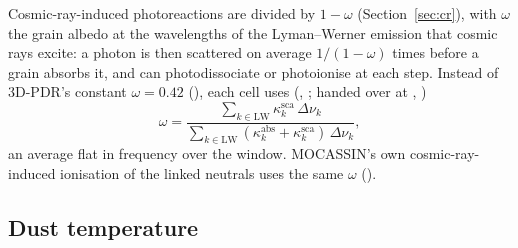 Cosmic-ray-induced photoreactions are divided by $1-\omega$
(Section~\ref{sec:cr}), with $\omega$ the grain albedo at the wavelengths of
the \Htwo{} Lyman--Werner emission that cosmic rays excite: a photon is then
scattered on average $1/(1-\omega)$ times before a grain absorbs it, and
can photodissociate or photoionise at each step. Instead of 3D-PDR's
constant $\omega=0.42$ (), each cell uses
(, ; handed over at
, )
\begin{equation}
  \omega = \frac{\sum_{k\in\mathrm{LW}} \kappa^{\mathrm{sca}}_k\,\Delta\nu_k}
                {\sum_{k\in\mathrm{LW}} (\kappa^{\mathrm{abs}}_k+\kappa^{\mathrm{sca}}_k)\,\Delta\nu_k},
\end{equation}
an average flat in frequency over the window. MOCASSIN's own cosmic-ray-induced
ionisation of the linked neutrals uses the same $\omega$
().

\subsection{Dust temperature}
\label{sec:Td}

